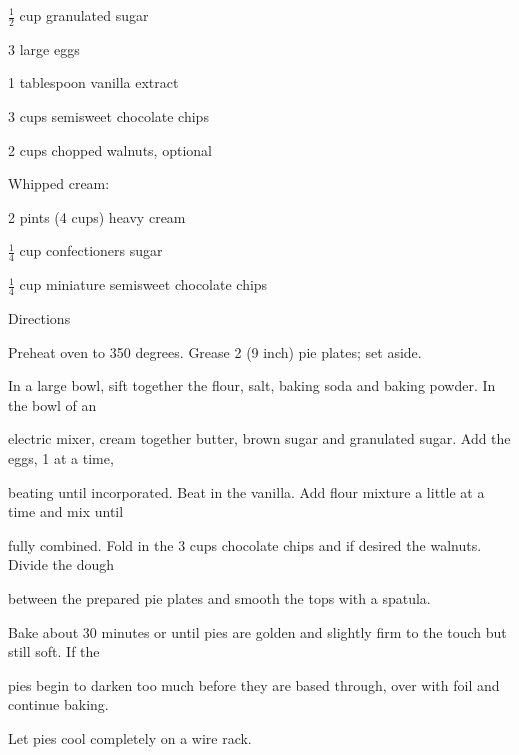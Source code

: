 \documentclass[a4paper,portrait,12pt]{book}
\begin{document}
$\frac{1}{2}$ cup granulated sugar




3 large eggs




1 tablespoon vanilla extract




3 cups semisweet chocolate chips




2 cups chopped walnuts, optional




Whipped cream:




2 pints (4 cups) heavy cream




$\frac{1}{4}$ cup confectioners sugar




$\frac{1}{4}$ cup miniature semisweet chocolate chips




Directions




Preheat oven to 350 degrees. Grease 2 (9 inch) pie plates; set aside.




In a large bowl, sift together the flour, salt, baking soda and baking powder. In the bowl of an




electric mixer, cream together butter, brown sugar and granulated sugar. Add the eggs, 1 at a time,




beating until incorporated. Beat in the vanilla. Add flour mixture a little at a time and mix until




fully combined. Fold in the 3 cups chocolate chips and if desired the walnuts. Divide the dough




between the prepared pie plates and smooth the tops with a spatula.




Bake about 30 minutes or until pies are golden and slightly firm to the touch but still soft. If the




pies begin to darken too much before they are based through, over with foil and continue baking.




Let pies cool completely on a wire rack.
\end{document}
